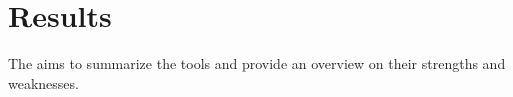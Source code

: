 
\chapter{Results}
The aims to summarize the tools and provide an overview on their strengths and weaknesses. 

